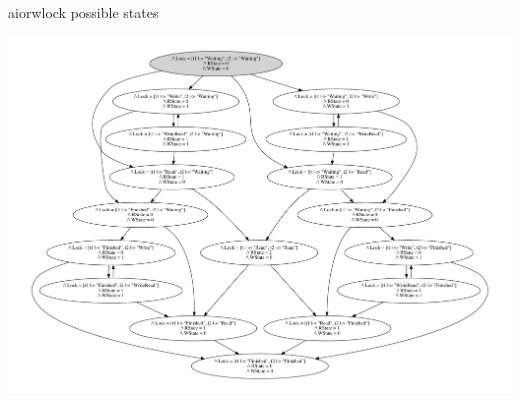 \documentclass[12pt]{beamer}
\begin{document}
  \begin{frame}{aiorwlock possible states}
      \begin{center}
          \includegraphics[scale=0.35,angle=90]{figures/aiorwlock_model}
      \end{center}
  \end{frame}
\end{document}
